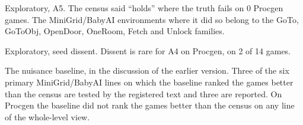 \documentclass[journal,onecolumn]{IEEEtran}
\begin{document}
Exploratory, A5. The census said ``holds'' where the truth fails on 0
Procgen games. The MiniGrid/BabyAI environments where it did so belong
to the GoTo, GoToObj, OpenDoor, OneRoom, Fetch and Unlock families.

Exploratory, seed dissent. Dissent is rare for A4 on Procgen, on 2 of 14
games.

The nuisance baseline, in the discussion of the earlier version. Three
of the six primary MiniGrid/BabyAI lines on which the baseline ranked
the games better than the census are tested by the registered text and
three are reported. On Procgen the baseline did not rank the games
better than the census on any line of the whole-level view.
\end{document}
